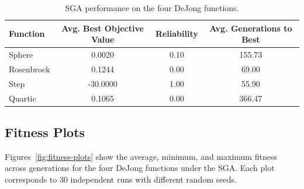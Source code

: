 \documentclass[11pt]{article}
\begin{document}
\begin{table}[H]
\centering
\caption{SGA performance on the four DeJong functions.}
\label{tab:sga-performance}
\begin{tabular}{lccc}
\toprule
Function   & Avg. Best Objective Value & Reliability & Avg. Generations to Best \\
\midrule
Sphere      & 0.0020  & 0.10 & 155.73 \\
Rosenbrock  & 0.1244  & 0.00 & 69.00 \\
Step        & -30.0000 & 1.00 & 55.90 \\
Quartic     & 0.1065  & 0.00 & 366.47 \\
\bottomrule
\end{tabular}
\end{table}

\newpage
\subsection{Fitness Plots}
Figures~\ref{fig:fitness-plots} show the average, minimum, and maximum fitness across generations for the four DeJong functions under the SGA. Each plot corresponds to 30 independent runs with different random seeds.
\end{document}
